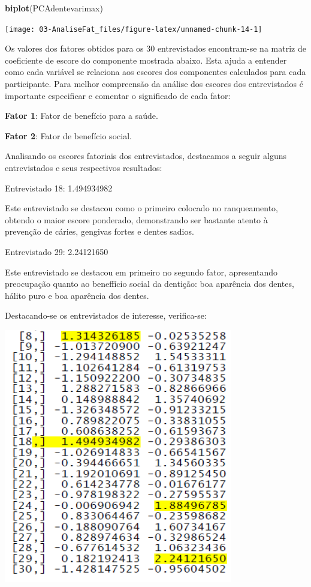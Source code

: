 \documentclass[12pt,brazil,oneside]{book}
\newenvironment{Shaded}{\begin{snugshade}}{\end{snugshade}}
\newcommand{\KeywordTok}[1]{\textcolor[rgb]{0.13,0.29,0.53}{\textbf{#1}}}
\newcommand{\NormalTok}[1]{#1}
\begin{document}
\begin{Shaded}
\begin{Highlighting}[]
\KeywordTok{biplot}\NormalTok{(PCAdentevarimax)}
\end{Highlighting}
\end{Shaded}

\begin{center}\texttt{[image: 03-AnaliseFat\_files/figure-latex/unnamed-chunk-14-1]} \end{center}

Os valores dos fatores obtidos para os 30 entrevistados encontram-se na
matriz de coeficiente de escore do componente mostrada abaixo. Esta
ajuda a entender como cada variável se relaciona aos escores dos
componentes calculados para cada participante. Para melhor compreensão
da análise dos escores dos entrevistados é importante especificar e
comentar o significado de cada fator:

\textbf{Fator 1}: Fator de benefício para a saúde.

\textbf{Fator 2}: Fator de benefício social.

Analisando os escores fatoriais dos entrevistados, destacamos a seguir
alguns entrevistados e seus respectivos resultados:

Entrevistado 18: 1.494934982

Este entrevistado se destacou como o primeiro colocado no ranqueamento,
obtendo o maior escore ponderado, demonstrando ser bastante atento à
prevenção de cáries, gengivas fortes e dentes sadios.

Entrevistado 29: 2.24121650

Este entrevistado se destacou em primeiro no segundo fator, apresentando
preocupação quanto ao beneffício social da dentição: boa aparência dos
dentes, hálito puro e boa aparência dos dentes.

Destacando-se os entrevistados de interesse, verifica-se:

\includegraphics{anfat2.png}
\end{document}
